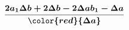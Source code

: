 \documentclass[preview]{standalone}
\begin{document}
\begin{align*}
\boldsymbol{\frac{2a_1\Delta b + 2\Delta b - 2\Delta ab_1 - \Delta a}{\color{red}{\Delta a}}}
\end{align*}
\end{document}
